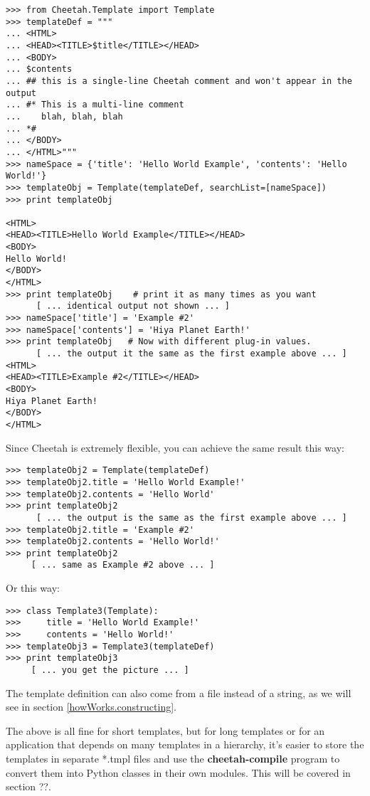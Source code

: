 \begin{verbatim}
>>> from Cheetah.Template import Template
>>> templateDef = """
... <HTML>
... <HEAD><TITLE>$title</TITLE></HEAD>
... <BODY>
... $contents
... ## this is a single-line Cheetah comment and won't appear in the output
... #* This is a multi-line comment
...    blah, blah, blah 
... *#
... </BODY>
... </HTML>"""
>>> nameSpace = {'title': 'Hello World Example', 'contents': 'Hello World!'}
>>> templateObj = Template(templateDef, searchList=[nameSpace])
>>> print templateObj
 
<HTML>
<HEAD><TITLE>Hello World Example</TITLE></HEAD>
<BODY>
Hello World!
</BODY>
</HTML>
>>> print templateObj    # print it as many times as you want
      [ ... identical output not shown ... ]
>>> nameSpace['title'] = 'Example #2'
>>> nameSpace['contents'] = 'Hiya Planet Earth!'
>>> print templateObj   # Now with different plug-in values.
      [ ... the output it the same as the first example above ... ]
<HTML>
<HEAD><TITLE>Example #2</TITLE></HEAD>
<BODY>
Hiya Planet Earth!
</BODY>
</HTML>

\end{verbatim}

Since Cheetah is extremely flexible, you can achieve the same result this
way:  

\begin{verbatim}
>>> templateObj2 = Template(templateDef)
>>> templateObj2.title = 'Hello World Example!'
>>> templateObj2.contents = 'Hello World'
>>> print templateObj2
      [ ... the output is the same as the first example above ... ]
>>> templateObj2.title = 'Example #2'
>>> templateObj2.contents = 'Hello World!'
>>> print templateObj2
     [ ... same as Example #2 above ... ]
\end{verbatim}

Or this way:

\begin{verbatim}
>>> class Template3(Template):
>>>     title = 'Hello World Example!'
>>>     contents = 'Hello World!'
>>> templateObj3 = Template3(templateDef)
>>> print templateObj3
     [ ... you get the picture ... ]
\end{verbatim}

The template definition can also come from a file instead of a string,
as we will see in section \ref{howWorks.constructing}.

The above is all fine for short templates, but for long templates or
for an application that depends on many templates in a hierarchy, it's
easier to store the templates in separate *.tmpl files and use the
{\bf cheetah-compile} program to convert them into Python classes in
their own modules.  This will be covered in section ??.  

